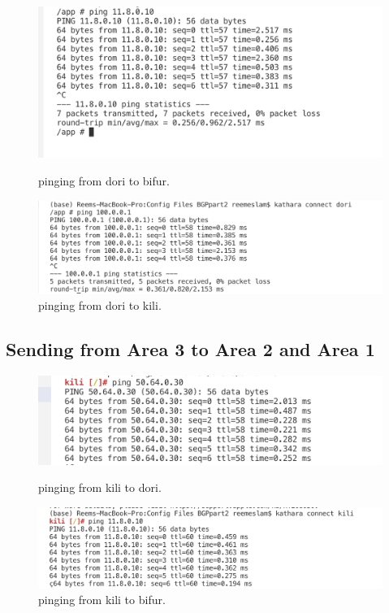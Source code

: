 \begin{figure}[H]
  \centering
  \begin{minipage}[b]{0.45\textwidth}
    \includegraphics[width=\textwidth]{Images/dori2bifur.png}
    \caption{pinging from dori to bifur.}
  \end{minipage}
  \hfill
  \begin{minipage}[b]{0.45\textwidth}
    \includegraphics[width=\textwidth]{Images/dori2kili.png}
    \caption{pinging from dori to kili.}
  \end{minipage}
\end{figure}

\subsection{Sending from Area 3 to Area 2 and Area 1}

\begin{figure}[H]
  \centering
  \begin{minipage}[b]{0.45\textwidth}
    \includegraphics[width=\textwidth]{Images/kili2dori.png}
    \caption{pinging from kili to dori.}
  \end{minipage}
  \hfill
  \begin{minipage}[b]{0.45\textwidth}
    \includegraphics[width=\textwidth]{Images/kili2bifur.png}
    \caption{pinging from kili to bifur.}
  \end{minipage}
\end{figure}

